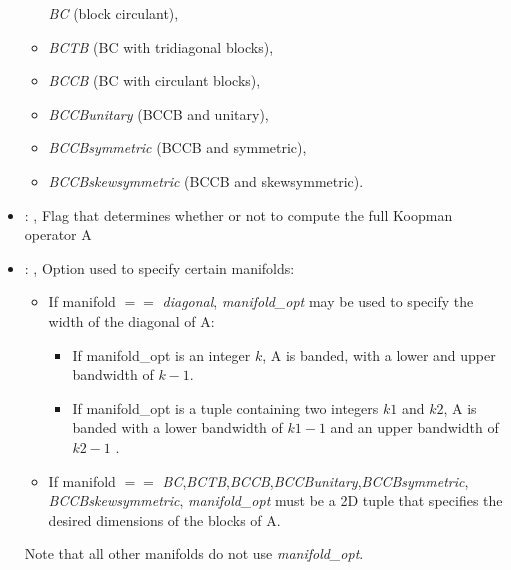 \begin{itemize}
\begin{itemize}
      \textit{BC} (block circulant),                                                   \item
      \textit{BCTB} (BC with tridiagonal blocks),
      \item \textit{BCCB} (BC with circulant blocks),
      \item \textit{BCCBunitary} (BCCB and unitary),
      \item \textit{BCCBsymmetric} (BCCB and symmetric),
      \item \textit{BCCBskewsymmetric} (BCCB and skewsymmetric).
      \end{itemize}

    \item {}: , 
      Flag that determines whether or not to compute the full Koopman operator A

    \item {}: , 
      Option used to specify certain manifolds:
      \begin{itemize}                                                    \item If manifold $==$
      \textit{diagonal}, \textit{manifold\_opt} may be used to specify the width of the diagonal of
      A:                                                    \begin{itemize}
      \item If manifold\_opt is an integer $k$, A is banded, with a lower and upper bandwidth of
      $k-1$.                                                      \item If manifold\_opt is a tuple
      containing two integers $k1$ and $k2$, A is banded with
      a lower bandwidth of $k1-1$ and an upper bandwidth of $k2-1$
      .   \end{itemize}                                                    \item If manifold $==$
      \textit{BC},\textit{BCTB},\textit{BCCB},\textit{BCCBunitary},\textit{BCCBsymmetric},
      \textit{BCCBskewsymmetric}, \textit{manifold\_opt} must be a 2D tuple that specifies the
      desired dimensions                                                       of the blocks of A.
      \end{itemize}                                                   Note that all other manifolds
      do not use \textit{manifold\_opt}.
  \end{itemize}

